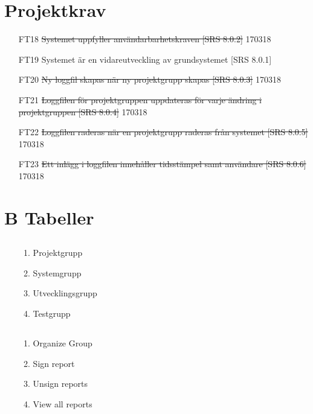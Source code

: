 \documentclass[paper=a4, fontsize=11pt,twoside]{article}
\begin{document}
\section{Projektkrav} 
\begin{itemize}
\item[FT18] \sout{Systemet uppfyller användarbarhetskraven [SRS 8.0.2]} 170318 
\item[FT19] Systemet är en vidareutveckling av grundsystemet [SRS 8.0.1]
\item[FT20] \sout{Ny loggfil skapas när ny projektgrupp skapas [SRS 8.0.3]}
170318
\item[FT21] \sout{Loggfilen för projektgruppen uppdateras för varje ändring i
projektgruppen [SRS 8.0.4]} 170318
\item[FT22] \sout{Loggfilen raderas när en projektgrupp raderas från systemet
[SRS 8.0.5] } 170318
\item[FT23] \sout{Ett inlägg i loggfilen innehåller tidsstämpel samt användare
[SRS 8.0.6]} 170318
\end{itemize}


\section*{B Tabeller}

\subsection{ }
\begin{enumerate}
\item[]
	\begin{enumerate}
	\item Projektgrupp
	\item Systemgrupp
	\item Utvecklingsgrupp
	\item Testgrupp
	\end{enumerate}
\end{enumerate}

\subsection{ }
\begin{enumerate}
\item[]
	\begin{enumerate}
	\item Organize Group
	\item Sign report
	\item Unsign reports
	\item View all reports
	\end{enumerate}
\end{enumerate}
\end{document}

